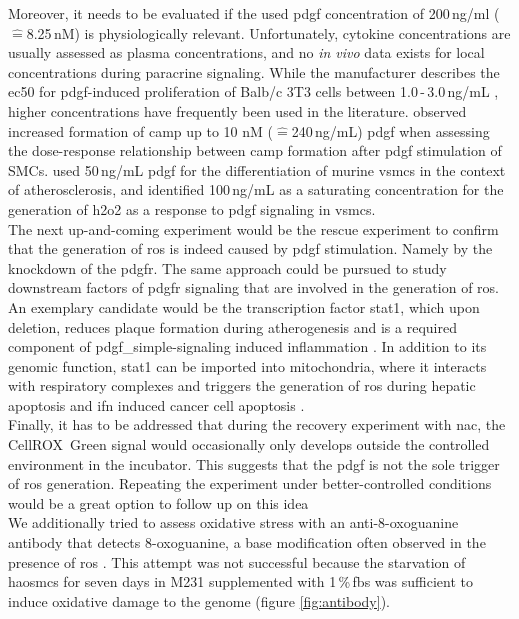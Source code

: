 Moreover, it needs to be evaluated if the used \ac{pdgf} concentration of 200\,ng/ml ($\widehat{=}$8.25\,nM) is physiologically relevant. Unfortunately, cytokine concentrations are usually assessed as plasma concentrations, and no \textit{in vivo} data exists for local concentrations during paracrine signaling. While the manufacturer describes the \ac{ec50} for \ac{pdgf}-induced proliferation of Balb/c 3T3 cells between 1.0\,-\,3.0\,ng/mL \cite{peprotecheclimitedRecombinantHumanPDGFBB2022}, higher concentrations have frequently been used in the literature. \textcite{gravesPlateletderivedGrowthFactor1996a} observed increased formation of \ac{camp} up to 10 nM ($\widehat{=}$240\,ng/mL) \ac{pdgf} when assessing the dose-response relationship between \ac{camp} formation after \ac{pdgf} stimulation of SMCs. \textcite{newmanMultipleCellTypes2021a} used 50\,ng/mL \ac{pdgf} for the differentiation of murine \acp{vsmc} in the context of atherosclerosis, and \textcite{bouziguesRegulationROSResponse2014a} identified 100\,ng/mL as a saturating concentration for the generation of \ac{h2o2} as a response to \ac{pdgf} signaling in \acp{vsmc}.\\
The next up-and-coming experiment would be the rescue experiment to confirm that the generation of \ac{ros} is indeed caused by \ac{pdgf} stimulation. Namely by the knockdown of the \ac{pdgfr}\beta. The same approach could be pursued to study downstream factors of \ac{pdgfr} signaling that are involved in the generation of \ac{ros}. An exemplary candidate would be the transcription factor \ac{stat1}, which upon deletion, reduces plaque formation during atherogenesis and is a required component of \ac{pdgf_simple}-signaling induced inflammation \cite{hePDGFRbetaSignallingRegulates2015}. In addition to its genomic function, \ac{stat1} can be imported into mitochondria, where it interacts with respiratory complexes and triggers the generation of \ac{ros} \cite{wangSTATROSCycleExtends2018} during hepatic apoptosis \cite{leeRoleSTAT1IRF12007} and \ac{ifn} induced cancer cell apoptosis \cite{wangSTATROSCycleExtends2018}.\\
Finally, it has to be addressed that during the recovery experiment with \ac{nac}, the CellROX\texttrademark~Green signal would occasionally only develops outside the controlled environment in the incubator. This suggests that the \ac{pdgf} is not the sole trigger of \ac{ros} generation. Repeating the experiment under better-controlled conditions would be a great option to follow up on this idea\\
We additionally tried to assess oxidative stress with an anti-8-oxoguanine antibody that detects 8-oxoguanine, a base modification often observed in the presence of \ac{ros} \cite{leon8OxoguanineAccumulationMitochondrial2016}. This attempt was not successful because the starvation of \acp{haosmc} for seven days in M231 supplemented with 1\,\%\,\ac{fbs} was sufficient to induce oxidative damage to the genome (figure \ref{fig:antibody}).


